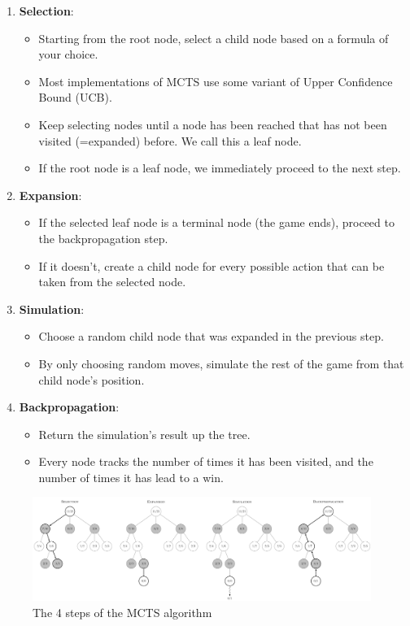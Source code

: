 \documentclass{article}
\begin{document}
\begin{enumerate}
    \item \textbf{Selection}:
    \begin{itemize}
        \item Starting from the root node, select a child node based on a formula of your choice.
        \item Most implementations of MCTS use some variant of Upper Confidence Bound (UCB).
        \item Keep selecting nodes until a node has been reached that has not been visited (=expanded) before. We call this a leaf node.
        \item If the root node is a leaf node, we immediately proceed to the next step.
    \end{itemize}
    \item \textbf{Expansion}:
    \begin{itemize}
        \item If the selected leaf node is a terminal node (the game ends), proceed to the backpropagation step.
        \item If it doesn't, create a child node for every possible action that can be taken from the selected node.
    \end{itemize}
    \item \textbf{Simulation}:
    \begin{itemize}
        \item Choose a random child node that was expanded in the previous step.
        \item By only choosing random moves, simulate the rest of the game from that child node's position.
    \end{itemize}
    \item \textbf{Backpropagation}:
    \begin{itemize}
        \item Return the simulation's result up the tree.
        \item Every node tracks the number of times it has been visited, and the number of times it has lead to a win.
    \end{itemize}
\end{enumerate}


\begin{figure}[H]
    \centering
    \includegraphics[width=0.98\textwidth]{img/MCTS-steps.png}
    \caption{The 4 steps of the MCTS algorithm \cite{MonteCarloTree2022}}
\end{figure}
\end{document}

